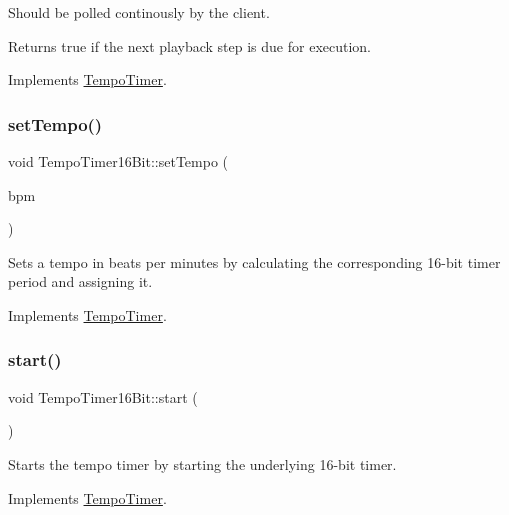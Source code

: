 Should be polled continously by the client. \begin{DoxyReturn}{Returns}
true if the next playback step is due for execution. 
\end{DoxyReturn}


Implements \mbox{\hyperlink{class_tempo_timer}{Tempo\+Timer}}.

\mbox{\label{class_tempo_timer16_bit_adbd6f0e4af015b240e65109a128988a4}} 
\subsubsection{\texorpdfstring{setTempo()}{setTempo()}}
{\footnotesize\ttfamily void Tempo\+Timer16\+Bit\+::set\+Tempo (\begin{DoxyParamCaption}\item[{\mbox{\hyperlink{class_beats_per_minute}{Beats\+Per\+Minute}}}]{bpm }\end{DoxyParamCaption})\hspace{0.3cm}{\ttfamily [virtual]}}

Sets a tempo in beats per minutes by calculating the corresponding 16-\/bit timer period and assigning it. 

Implements \mbox{\hyperlink{class_tempo_timer}{Tempo\+Timer}}.

\mbox{\label{class_tempo_timer16_bit_a84b46988dda79e20172382417966de13}} 
\subsubsection{\texorpdfstring{start()}{start()}}
{\footnotesize\ttfamily void Tempo\+Timer16\+Bit\+::start (\begin{DoxyParamCaption}{ }\end{DoxyParamCaption})\hspace{0.3cm}{\ttfamily [virtual]}}

Starts the tempo timer by starting the underlying 16-\/bit timer. 

Implements \mbox{\hyperlink{class_tempo_timer}{Tempo\+Timer}}.

\mbox{\label{class_tempo_timer16_bit_a1f5d42ac7fe24317a0c04484bbf345c6}} 
